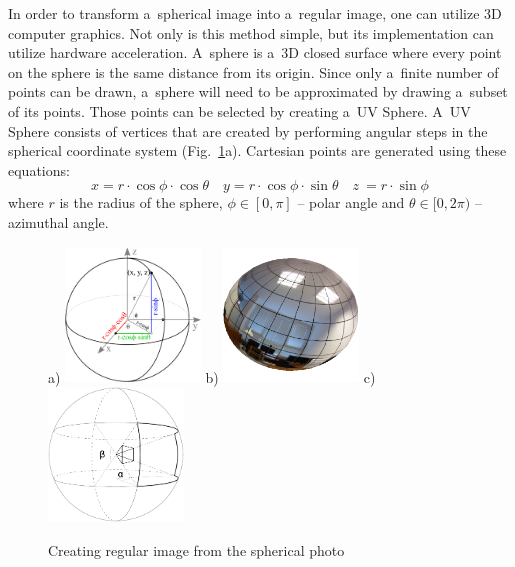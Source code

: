 \documentclass{svproc}
\begin{document}
In order to transform a~spherical image into a~regular image, one can utilize 3D computer graphics.
Not only is this method simple, but its implementation can utilize hardware acceleration.
A~sphere is a~3D closed surface where every point on the sphere is the same distance from its origin. %
Since only a~finite number of points can be drawn, a~sphere will need to be approximated by drawing a~subset of its points.
Those points can be selected by creating a~UV Sphere.
A~UV Sphere consists of vertices that are created by performing angular steps in the spherical coordinate system (Fig.~\ref{fig:spheres}a).
Cartesian points are generated using these equations:
\begin{equation}
    x = r \cdot \cos \phi \cdot \cos \theta \quad y = r \cdot \cos \phi \cdot \sin \theta \quad z~= r \cdot \sin \phi \nonumber
\end{equation}
where $r$ is the radius of the sphere, $\phi \in [0, \pi]$ -- polar angle and $\theta \in [0, 2\pi)$ -- azimuthal angle.

\begin{figure}[ht!]
    \centering
    a) \hspace{-3mm}\includegraphics[width=0.32\textwidth]{img/genpoint}
    b) \hspace{-3mm}\includegraphics[width=0.32\textwidth]{img/gl_sphere/textured}
    c) \hspace{-3mm}\includegraphics[width=0.32\textwidth]{img/sphere}
    \caption{Creating regular image from the spherical photo}
    \label{fig:spheres}
\end{figure}
\end{document}
